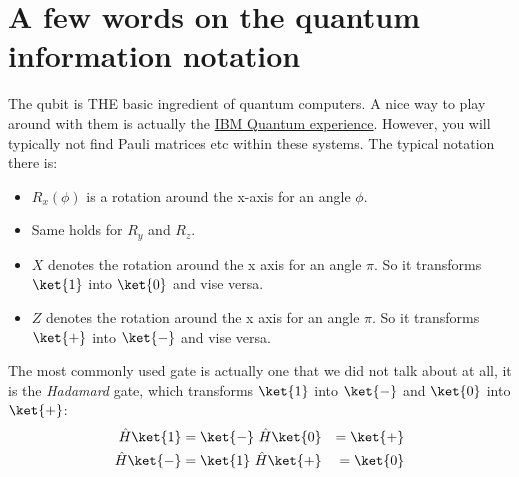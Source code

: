 \section{A few words on the quantum information notation}

The qubit is THE basic ingredient of quantum computers. A nice way to play around with them is actually the \href{https://quantum-computing.ibm.com/}{IBM Quantum experience}. However, you will typically not find Pauli matrices etc within these systems. The typical notation there is:
\begin{itemize}
\item $R_x(\phi)$ is a rotation around the x-axis for an angle $\phi$.
\item Same holds for $R_y$ and $R_z$.
\item $X$ denotes the rotation around the x axis for an angle $\pi$. So it transforms $\ket{1}$ into  $\ket{0}$ and vise versa.
\item $Z$ denotes the rotation around the x axis for an angle $\pi$. So it transforms $\ket{+}$ into  $\ket{-}$ and vise versa.
\end{itemize}
The most commonly used gate is actually one that we did not talk about at all, it is the \textit{Hadamard} gate, which transforms $\ket{1}$ into  $\ket{-}$ and $\ket{0}$ into  $\ket{+}$:
\begin{align}
\hat{H}\ket{1} &= \ket{-}  ~   \hat{H}\ket{0} &= \ket{+}\\
\hat{H}\ket{-} &= \ket{1}  ~   \hat{H}\ket{+} &= \ket{0}
\end{align}